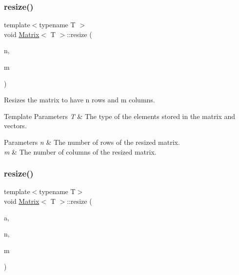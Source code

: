 \subsubsection{\texorpdfstring{resize()}{resize()}\hspace{0.1cm}{\footnotesize\ttfamily [1/2]}}
{\footnotesize\ttfamily template$<$typename T $>$ \\
void \mbox{\hyperlink{classMatrix}{Matrix}}$<$ T $>$\+::resize (\begin{DoxyParamCaption}\item[{const unsigned int}]{n,  }\item[{const unsigned int}]{m }\end{DoxyParamCaption})\hspace{0.3cm}{\ttfamily [inline]}}



Resizes the matrix to have {\ttfamily n} rows and {\ttfamily m} columns. 


\begin{DoxyTemplParams}{Template Parameters}
{\em T} & The type of the elements stored in the matrix and vectors. \\
\hline
\end{DoxyTemplParams}

\begin{DoxyParams}{Parameters}
{\em n} & The number of rows of the resized matrix. \\
\hline
{\em m} & The number of columns of the resized matrix. \\
\hline
\end{DoxyParams}
\mbox{\label{classMatrix_ae866a1b312aa040b587b40c5f54b6a54}} 
\subsubsection{\texorpdfstring{resize()}{resize()}\hspace{0.1cm}{\footnotesize\ttfamily [2/2]}}
{\footnotesize\ttfamily template$<$typename T$>$ \\
void \mbox{\hyperlink{classMatrix}{Matrix}}$<$ T $>$\+::resize (\begin{DoxyParamCaption}\item[{const T \&}]{a,  }\item[{const unsigned int}]{n,  }\item[{const unsigned int}]{m }\end{DoxyParamCaption})\hspace{0.3cm}{\ttfamily [inline]}}



